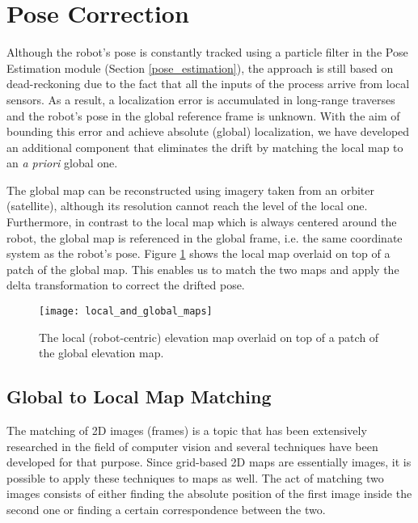 \section{Pose Correction} \label{pose_correction}

Although the robot's pose is constantly tracked using a particle filter in the
Pose Estimation module (Section \ref{pose_estimation}), the approach
is still based on dead-reckoning due to the fact that all the inputs
of the process arrive from local sensors.
As a result, a localization error is accumulated in long-range traverses
and the robot's pose in the global reference frame is unknown.
With the aim of bounding this error and achieve absolute (global) localization,
we have developed an additional component that eliminates
the drift by matching the local map to an \textit{a priori} global one.

The global map can be reconstructed using imagery taken from an
orbiter (satellite), although its resolution cannot reach the level of
the local one.
Furthermore, in contrast to the local map which is always centered around
the robot, the global map is referenced in the global frame, i.e. the
same coordinate system as the robot's pose.
Figure \ref{fig:local_and_global_maps} shows the local map overlaid on
top of a patch of the global map.
This enables us to match the two maps and apply the delta transformation
to correct the drifted pose.

\begin{figure}[h!]
    \centering
    \texttt{[image: local\_and\_global\_maps]}
    \caption[Local map overlaid on global map]{
        The local (robot-centric) elevation map overlaid on top of a patch of
        the global elevation map.
    }
    \label{fig:local_and_global_maps}
\end{figure}

\subsection{Global to Local Map Matching} \label{map_matching}

The matching of 2D images (frames) is a topic that has been extensively
researched in the field of computer vision and several techniques have
been developed for that purpose.
Since grid-based 2D maps are essentially images, it is possible to
apply these techniques to maps as well.
The act of matching two images consists of either finding the absolute
position of the first image inside the second one or finding a certain
correspondence between the two.

